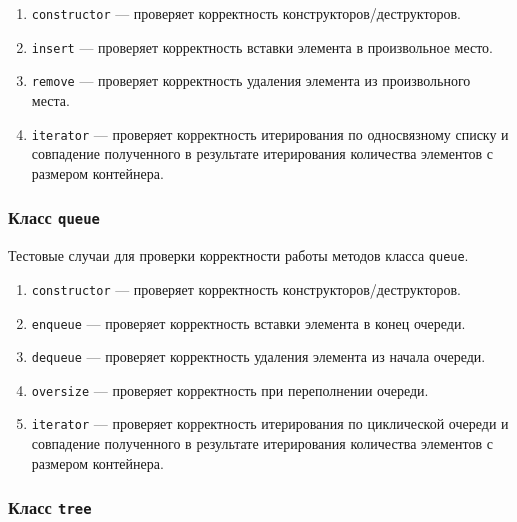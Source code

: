 \documentclass[a4paper,12pt]{article}
\begin{document}
\begin{enumerate}

\item
\verb!constructor! — проверяет корректность конструкторов/деструкторов.

\item
\verb!insert! — проверяет корректность вставки элемента в произвольное место.

\item
\verb!remove! — проверяет корректность удаления элемента из произвольного места.

\item
\verb!iterator! — проверяет корректность итерирования по односвязному списку и совпадение полученного в результате итерирования количества элементов с размером контейнера.

\end{enumerate}

\subsubsection{Класс {\tt queue}}

Тестовые случаи для проверки корректности работы методов класса {\tt queue}.

\begin{enumerate}

\item
\verb!constructor! — проверяет корректность конструкторов/деструкторов.

\item
\verb!enqueue! — проверяет корректность вставки элемента в конец очереди.

\item
\verb!dequeue! — проверяет корректность удаления элемента из начала очереди.

\item
\verb!oversize! — проверяет корректность при переполнении очереди.

\item
\verb!iterator! — проверяет корректность итерирования по циклической очереди и совпадение полученного в результате итерирования количества элементов с размером контейнера.

\end{enumerate}

\subsubsection{Класс {\tt tree}}
\end{document}
